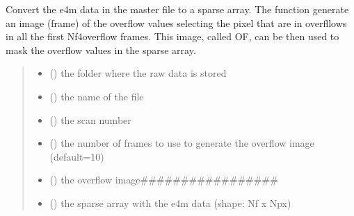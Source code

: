 \documentclass[letterpaper,10pt,english]{sphinxmanual}
\begin{document}
\begin{fulllineitems}
\label{\detokenize{index:ID10_tools.convert_dense_e4m_v1}}
\pysigstartsignatures
\pysiglinewithargsret
{}
{\sphinxparamcomma {}\sphinxparamcomma {}\sphinxparamcomma {}\sphinxparamcomma {}\sphinxparamcomma {}\sphinxparamcomma {}}
{}
\pysigstopsignatures
\sphinxAtStartPar
Convert the e4m data in the master file to a sparse array. The function generate an image (frame) of the overflow values selecting the pixel that are in overfllows in all the first Nf4overflow frames. This image, called OF, can be then used to mask the overflow values in the sparse array.
\begin{quote}\begin{description}
\begin{itemize}
\item {} 
\sphinxAtStartPar
{} () \textendash{} the folder where the raw data is stored

\item {} 
\sphinxAtStartPar
{} () \textendash{} the name of the file

\item {} 
\sphinxAtStartPar
{} () \textendash{} the scan number

\item {} 
\sphinxAtStartPar
{} () \textendash{} the number of frames to use to generate the overflow image (default=10)

\end{itemize}

\sphinxAtStartPar
\begin{itemize}
\item {} 
\sphinxAtStartPar
{} () \textendash{} the overflow image\#\#\#\#\#\#\#\#\#\#\#\#\#\#\#\#\#

\item {} 
\sphinxAtStartPar
{} () \textendash{} the sparse array with the e4m data (shape: Nf x Npx)

\end{itemize}


\end{description}\end{quote}

\end{fulllineitems}
\end{document}
